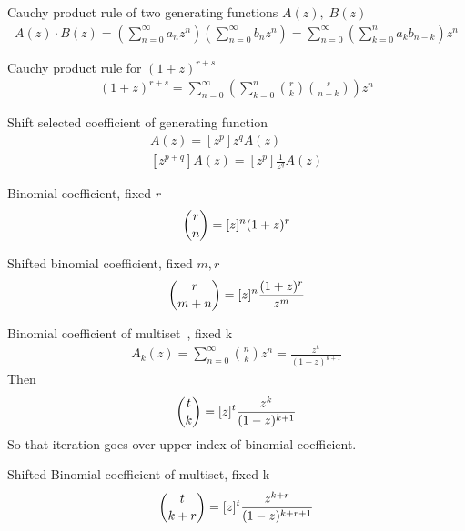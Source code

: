 ﻿\begin{identity}
    Cauchy product rule of two generating functions $A(z), \; B(z)$
    \begin{align*}
        A(z) \cdot B(z) = \left( \sum_{n=0}^{\infty} a_n z^n \right) \left( \sum_{n=0}^{\infty} b_n z^n \right)
        = \sum_{n=0}^{\infty} \left( \sum_{k=0}^{n} a_k b_{n-k} \right) z^n
    \end{align*}
\end{identity}
\begin{identity}
    Cauchy product rule for $(1+z)^{r+s}$
    \begin{align*}
    (1 + z)
        ^{r+s} = \sum_{n=0}^{\infty} \left( \sum_{k=0}^{n} \binom{r}{k} \binom{s}{n-k} \right) z^n
    \end{align*}
\end{identity}
\begin{identity}
    Shift selected coefficient of generating function
    \begin{align*}
    [z^{p-q}]
        A(z)=[z^p] z^{q} A(z) \\
        [z^{p+q}] A(z)=[z^p] \frac{1}{z^{q}} A(z)
    \end{align*}
\end{identity}
\begin{identity}
    Binomial coefficient, fixed $r$
    \begin{align*}
        \binom{r}{n} = [z]^{n} (1+z)^r
    \end{align*}
\end{identity}
\begin{identity}
    Shifted binomial coefficient, fixed $m, r$
    \begin{align*}
        \binom{r}{m+n} = [z]^{n} \frac{(1+z)^r}{z^m}
    \end{align*}
\end{identity}
\begin{identity}
    Binomial coefficient of multiset~\cite[eq. 8]{faris2011generating}, fixed k
    \begin{align*}
        A_k(z) = \sum_{n=0}^{\infty} \binom{n}{k} z^n = \frac{z^k}{(1-z)^{k+1}}
    \end{align*}
    Then
    \begin{align*}
        \binom{t}{k} = [z]^{t} \frac{z^k}{(1-z)^{k+1}}
    \end{align*}
    So that iteration goes over upper index of binomial coefficient.
\end{identity}
\begin{identity}
    Shifted Binomial coefficient of multiset, fixed k
    \begin{align*}
        \binom{t}{k+r} = [z]^{t} \frac{z^{k+r}}{(1-z)^{k+r+1}}
    \end{align*}
\end{identity}
